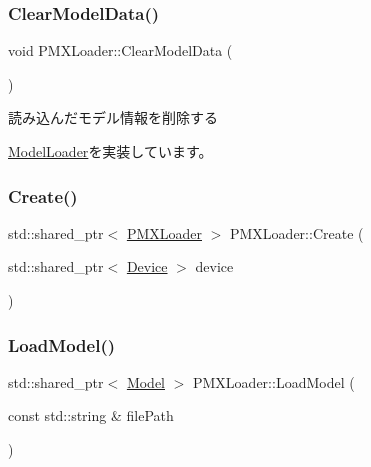 \subsubsection{\texorpdfstring{Clear\+Model\+Data()}{ClearModelData()}}
{\footnotesize\ttfamily void P\+M\+X\+Loader\+::\+Clear\+Model\+Data (\begin{DoxyParamCaption}{ }\end{DoxyParamCaption})\hspace{0.3cm}{\ttfamily [virtual]}}

読み込んだモデル情報を削除する 

\mbox{\hyperlink{class_model_loader_a6662edd78b17eeead09e822e19fc1799}{Model\+Loader}}を実装しています。

\mbox{\label{class_p_m_x_loader_afc9fa9ff6b5010857102ed82fd441f1b}} 
\subsubsection{\texorpdfstring{Create()}{Create()}}
{\footnotesize\ttfamily std\+::shared\+\_\+ptr$<$ \mbox{\hyperlink{class_p_m_x_loader}{P\+M\+X\+Loader}} $>$ P\+M\+X\+Loader\+::\+Create (\begin{DoxyParamCaption}\item[{std\+::shared\+\_\+ptr$<$ \mbox{\hyperlink{class_device}{Device}} $>$}]{device }\end{DoxyParamCaption})\hspace{0.3cm}{\ttfamily [static]}}

\mbox{\label{class_p_m_x_loader_aee4e81ab65eeec5c9772ed5a8de6c5fa}} 
\subsubsection{\texorpdfstring{Load\+Model()}{LoadModel()}}
{\footnotesize\ttfamily std\+::shared\+\_\+ptr$<$ \mbox{\hyperlink{class_model}{Model}} $>$ P\+M\+X\+Loader\+::\+Load\+Model (\begin{DoxyParamCaption}\item[{const std\+::string \&}]{file\+Path }\end{DoxyParamCaption})\hspace{0.3cm}{\ttfamily [virtual]}}

